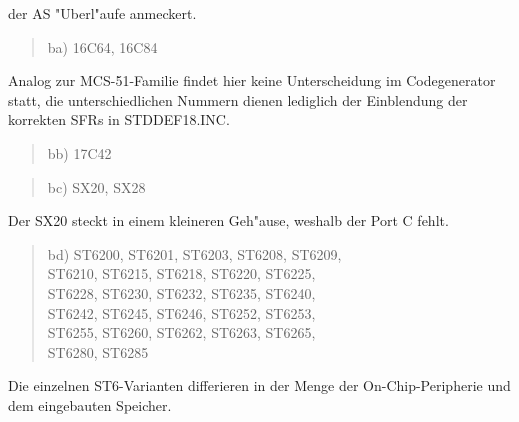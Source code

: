 \documentclass[12pt,a4paper,twoside]{report}
\begin{document}
der AS "Uberl"aufe anmeckert.
\begin{quote}
ba) 16C64, 16C84
\end{quote}
Analog zur MCS-51-Familie findet hier keine Unterscheidung im
Codegenerator statt, die unterschiedlichen Nummern dienen lediglich
der Einblendung der korrekten SFRs in STDDEF18.INC.
\begin{quote}
bb) 17C42
\end{quote}
\begin{quote}
bc) SX20, SX28
\end{quote}
Der SX20 steckt in einem kleineren Geh"ause, weshalb der Port C
fehlt.
\begin{quote}
bd) ST6200, ST6201, ST6203, ST6208, ST6209,\\
    ST6210, ST6215, ST6218, ST6220, ST6225,\\
    ST6228, ST6230, ST6232, ST6235, ST6240,\\
    ST6242, ST6245, ST6246, ST6252, ST6253,\\
    ST6255, ST6260, ST6262, ST6263, ST6265,\\
    ST6280, ST6285
\end{quote}
Die einzelnen ST6-Varianten differieren in der Menge der
On-Chip-Peripherie und dem eingebauten Speicher.
\end{document}
